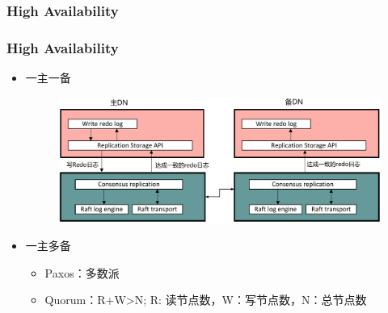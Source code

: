\subsubsection{High Availability}

\begin{frame}[fragile]
	\frametitle{High Availability}
	\begin{itemize}
		\item 一主一备
		\begin{figure}
			\includegraphics[width=.7\linewidth]{figs/dbfile-ha.pdf}
		\end{figure}
		\item 一主多备
		\begin{itemize}
			\item Paxos：多数派
			\item Quorum：R+W>N; R: 读节点数，W：写节点数，N：总节点数
		\end{itemize}
	\end{itemize}
\end{frame}

